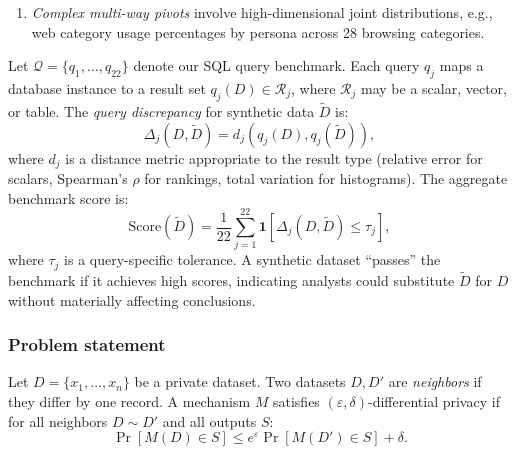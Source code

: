 \documentclass[12pt,letterpaper]{article}
\renewcommand{\_}{\textunderscore\allowbreak}
\begin{document}
\begin{enumerate}
\begin{verbatim}
-- RAM utilization by memory capacity
SELECT sysinfo_ram / 1024 AS ram_gb, COUNT(DISTINCT guid),
       ROUND(SUM(nrs * avg_percentage_used) / SUM(nrs)) AS avg_pct
FROM system_memory_utilization
WHERE avg_percentage_used > 0
GROUP BY sysinfo_ram ORDER BY sysinfo_ram;
\end{verbatim}

    \item \textit{Complex multi-way pivots} involve high-dimensional joint distributions, e.g., web category usage percentages by persona across 28 browsing categories.
\end{enumerate}

Let $\mathcal{Q} = \{q_1, \ldots, q_{22}\}$ denote our SQL query benchmark. Each query $q_j$ maps a database instance to a result set $q_j(D) \in \mathcal{R}_j$, where $\mathcal{R}_j$ may be a scalar, vector, or table. The \textit{query discrepancy} for synthetic data $\tilde{D}$ is:
\begin{equation}
    \Delta_j(D, \tilde{D}) = d_j(q_j(D), q_j(\tilde{D})),
\end{equation}
where $d_j$ is a distance metric appropriate to the result type (relative error for scalars, Spearman's $\rho$ for rankings, total variation for histograms). The aggregate benchmark score is:
\begin{equation}
    \text{Score}(\tilde{D}) = \frac{1}{22} \sum_{j=1}^{22} \mathbf{1}[\Delta_j(D, \tilde{D}) \leq \tau_j],
\end{equation}
where $\tau_j$ is a query-specific tolerance. A synthetic dataset ``passes'' the benchmark if it achieves high scores, indicating analysts could substitute $\tilde{D}$ for $D$ without materially affecting conclusions.

\newpage

\subsubsection{Problem statement}

Let $D = \{x_1, \ldots, x_n\}$ be a private dataset. Two datasets $D, D'$ are \textit{neighbors} if they differ by one record. A mechanism $M$ satisfies $(\varepsilon, \delta)$-differential privacy if for all neighbors $D \sim D'$ and all outputs $S$:
\begin{equation}
    \Pr[M(D) \in S] \leq e^{\varepsilon} \Pr[M(D') \in S] + \delta.
\end{equation}
\end{document}
